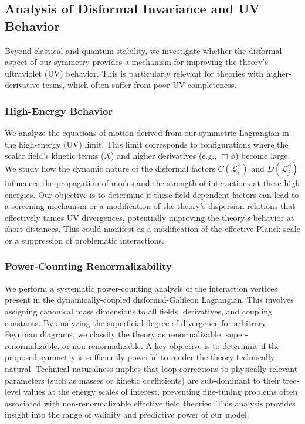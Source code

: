 \documentclass[twocolumn]{aastex631}
\begin{document}
\subsection{Analysis of Disformal Invariance and UV Behavior}

Beyond classical and quantum stability, we investigate whether the disformal aspect of our symmetry provides a mechanism for improving the theory's ultraviolet (UV) behavior. This is particularly relevant for theories with higher-derivative terms, which often suffer from poor UV completeness.

\subsubsection{High-Energy Behavior}
We analyze the equations of motion derived from our symmetric Lagrangian in the high-energy (UV) limit. This limit corresponds to configurations where the scalar field's kinetic terms ($X$) and higher derivatives (e.g., $\Box\phi$) become large. We study how the dynamic nature of the disformal factors $C(\mathcal{L}_i^\phi)$ and $D(\mathcal{L}_j^\phi)$ influences the propagation of modes and the strength of interactions at these high energies. Our objective is to determine if these field-dependent factors can lead to a screening mechanism or a modification of the theory's dispersion relations that effectively tames UV divergences, potentially improving the theory's behavior at short distances. This could manifest as a modification of the effective Planck scale or a suppression of problematic interactions.

\subsubsection{Power-Counting Renormalizability}
We perform a systematic power-counting analysis of the interaction vertices present in the dynamically-coupled disformal-Galileon Lagrangian. This involves assigning canonical mass dimensions to all fields, derivatives, and coupling constants. By analyzing the superficial degree of divergence for arbitrary Feynman diagrams, we classify the theory as renormalizable, super-renormalizable, or non-renormalizable. A key objective is to determine if the proposed symmetry is sufficiently powerful to render the theory technically natural. Technical naturalness implies that loop corrections to physically relevant parameters (such as masses or kinetic coefficients) are sub-dominant to their tree-level values at the energy scales of interest, preventing fine-tuning problems often associated with non-renormalizable effective field theories. This analysis provides insight into the range of validity and predictive power of our model.
\end{document}

